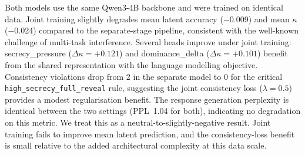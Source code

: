 \documentclass[11pt]{article}
\begin{document}
\begin{table}[tp]
\centering
\caption{Joint vs. separate training per-head comparison (selected heads: those with largest $\Delta\kappa$). Full 28-head table in \texttt{eval\_results/ablation\_joint\_vs\_separate.json}.}
\label{tab:joint_vs_separate}
\scriptsize\setlength{\tabcolsep}{2pt}
\end{table}

Both models use the same Qwen3-4B backbone and were trained on identical data.
Joint training slightly degrades mean latent accuracy ($-$0.009) and mean $\kappa$ ($-$0.024) compared to the separate-stage pipeline, consistent with the well-known challenge of multi-task interference.
Several heads improve under joint training: secrecy\_pressure ($\Delta\kappa{=}+0.121$) and dominance\_delta ($\Delta\kappa{=}+0.101$) benefit from the shared representation with the language modelling objective.
Consistency violations drop from 2 in the separate model to 0 for the critical \texttt{high\_secrecy\_full\_reveal} rule, suggesting the joint consistency loss ($\lambda{=}0.5$) provides a modest regularisation benefit.
The response generation perplexity is identical between the two settings (PPL~1.04 for both), indicating no degradation on this metric.
We treat this as a neutral-to-slightly-negative result. Joint training fails to improve mean latent prediction, and the consistency-loss benefit is small relative to the added architectural complexity at this data scale.
\end{document}
